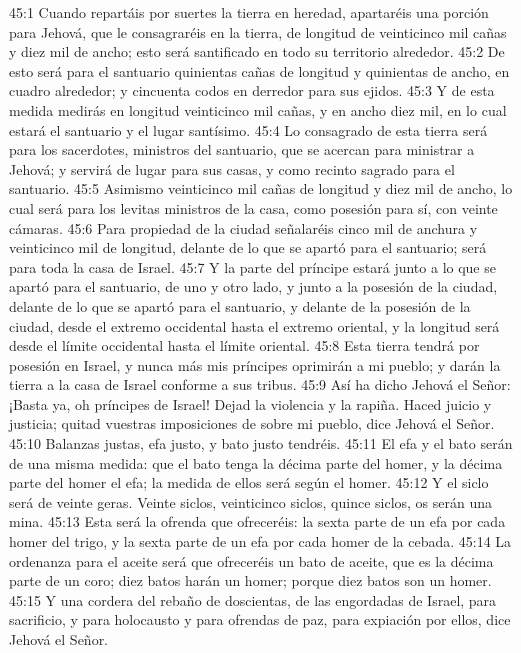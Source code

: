45:1 Cuando repartáis por suertes la tierra en heredad, apartaréis una porción para Jehová, que le consagraréis en la tierra, de longitud de veinticinco mil cañas   y diez mil de ancho; esto será santificado en todo su territorio alrededor.   
45:2 De esto será para el santuario quinientas cañas   de longitud y quinientas de ancho, en cuadro alrededor; y cincuenta codos en derredor para sus ejidos.   
45:3 Y de esta medida medirás en longitud veinticinco mil cañas,   y en ancho diez mil, en lo cual estará el santuario y el lugar santísimo.   
45:4 Lo consagrado de esta tierra será para los sacerdotes, ministros del santuario, que se acercan para ministrar a Jehová; y servirá de lugar para sus casas, y como recinto sagrado para el santuario.   
45:5 Asimismo veinticinco mil cañas   de longitud y diez mil de ancho, lo cual será para los levitas ministros de la casa, como posesión para sí, con veinte cámaras.   
45:6 Para propiedad de la ciudad señalaréis cinco mil de anchura y veinticinco mil de longitud, delante de lo que se apartó para el santuario; será para toda la casa de Israel.   
45:7 Y la parte del príncipe estará junto a lo que se apartó para el santuario, de uno y otro lado, y junto a la posesión de la ciudad, delante de lo que se apartó para el santuario, y delante de la posesión de la ciudad, desde el extremo occidental hasta el extremo oriental, y la longitud será desde el límite occidental hasta el límite oriental.   
45:8 Esta tierra tendrá por posesión en Israel, y nunca más mis príncipes oprimirán a mi pueblo; y darán la tierra a la casa de Israel conforme a sus tribus.   
45:9 Así ha dicho Jehová el Señor: ¡Basta ya, oh príncipes de Israel! Dejad la violencia y la rapiña. Haced juicio y justicia; quitad vuestras imposiciones de sobre mi pueblo, dice Jehová el Señor.   
45:10 Balanzas justas, efa justo, y bato  justo tendréis. 
45:11 El efa   y el bato serán de una misma medida: que el bato tenga la décima parte del homer, y la décima parte del homer el efa; la medida de ellos será según el homer.   
45:12 Y el siclo   será de veinte geras. Veinte siclos, veinticinco siclos, quince siclos, os serán una mina.   
45:13 Esta será la ofrenda que ofreceréis: la sexta parte de un efa   por cada homer del trigo, y la sexta parte de un efa por cada homer de la cebada.   
45:14 La ordenanza para el aceite será que ofreceréis un bato   de aceite, que es la décima parte de un coro; diez batos harán un homer; porque diez batos son un homer.   
45:15 Y una cordera del rebaño de doscientas, de las engordadas de Israel, para sacrificio, y para holocausto y para ofrendas de paz, para expiación por ellos, dice Jehová el Señor.   

